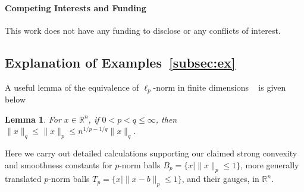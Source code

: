 \documentclass[sn-mathphys,Numbered]{sn-jnl}%
\newtheorem{lemma}[theorem]{Lemma}%
\begin{document}
\paragraph{Competing Interests and Funding}
This work does not have any funding to disclose or any conflicts of interest.


\begin{appendices}
{\small
\section{} \label{sec:append}
\subsection{Explanation of Examples~\ref{subsec:ex}} \label{append:ex}
A useful lemma of the equivalence of $\ell_p$-norm in finite dimensions ~\cite[Proposition 6.12]{folland1999real} is given below
\begin{lemma} \label{lem:norm-embeddings}
    For $x \in \mathbb{R}^n$, if $0< p <q \leq \infty$, then $\|x\|_q \leq \|x\|_p \leq n^{1/p-1/q}\|x\|_q$. 
\end{lemma}
Here we carry out detailed calculations supporting our claimed strong convexity and smoothness constants for $p$-norm balls $B_p=\{x \mid \|x\|_p\leq 1\}$, more generally translated $p$-norm balls $T_p=\{x \mid \|x-b\|_p\leq 1\}$, and their gauges, in $\mathbb{R}^n$.

}
\end{appendices}
\end{document}
